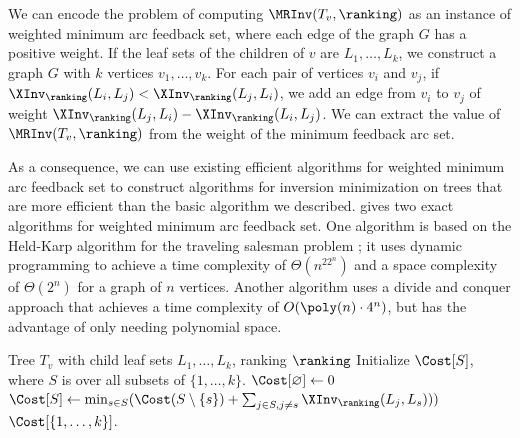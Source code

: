 We can encode the problem of computing $\MRInv(T_v,\ranking)$ as an instance of weighted minimum arc feedback set, where each edge of the graph $G$ has a positive weight. If the leaf sets of the children of $v$ are $L_1,\dots,L_k$, we construct a graph $G$ with $k$ vertices $v_1,\dots,v_k$. For each pair of vertices $v_i$ and $v_j$, if $\XInv_\ranking(L_i,L_j)<\XInv_\ranking(L_j,L_i)$, we add an edge from $v_i$ to $v_j$ of weight $\XInv_\ranking(L_j,L_i)-\XInv_\ranking(L_i,L_j)$. We can extract the value of $\MRInv(T_v,\ranking)$ from the weight of the minimum feedback arc set.

As a consequence, we can use existing efficient algorithms for weighted minimum arc feedback set to construct algorithms for inversion minimization on trees that are more efficient than the basic algorithm we described. \cite{Bodlaender2011} gives two exact algorithms for weighted minimum arc feedback set. One algorithm {\cite[Algorithm 1]{Bodlaender2011}} is based on the Held-Karp algorithm for the traveling salesman problem \cite{HK62}; it uses dynamic programming to achieve a time complexity of $\Theta(n^22^n)$ and a space complexity of $\Theta(2^n)$ for a graph of $n$ vertices. Another algorithm {\cite[Algorithm 2]{Bodlaender2011}} uses a divide and conquer approach that achieves a time complexity of $O(\poly(n)\cdot 4^n)$, but has the advantage of only needing polynomial space.

%
%

\begin{algorithm}[ht]
    \caption{$\MRInv(T_v, \ranking)$, Dynamic Programming}\label{alg:MRInv-DP}
    \begin{algorithmic}
        \Require Tree $T_v$ with child leaf sets $L_1,\dots,L_k$, ranking $\ranking$
        \State Initialize $\Cost[S]$, where $S$ is over all subsets of $\{1,\dots,k\}$.
        \State $\Cost[\varnothing]\gets 0$
                \State $\Cost[S]\gets \min_{s\in S} (\Cost(S\setminus \{s\}) + \sum_{j\in S, j\neq s} \XInv_\ranking(L_{j}, L_{s})))$
            \EndFor
        \EndFor
        \State \Return $\Cost[\{1,\dots,k\}]$.
    \end{algorithmic}
\end{algorithm}

